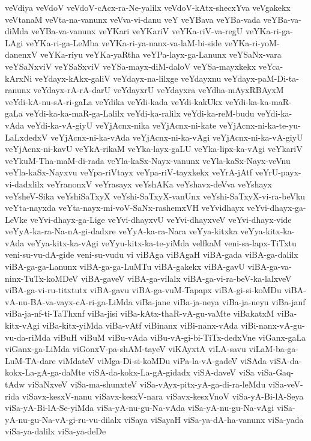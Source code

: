 {veVdiya
veVdoV
veVdoV-cAcx-ra-Ne-yalilx
veVdoV-kAtx-shecxYva
veVgakekx
veVtanaM
veVta-na-vanunx
veVva-vi-danu
veY
veYBava
veYBa-vada
veYBa-va-diMda
veYBa-va-vanunx
veYKari
veYKariV
veYKa-riV-va-regU
veYKa-ri-ga-LAgi
veYKa-ri-ga-LeMba
veYKa-ri-ya-nanx-va-laM-bi-side
veYKa-ri-yoM-danenxV
veYKa-riyu
veYKa-yaRtha
veYPa-layx-ga-Lanunx
veYSaNx-vara
veYSaNxviV
veYSaSxviV
veYSa-mayx-diM-daloV
veYSa-mayxkekx
veYca-kArxNi
veYdayx-kAkx-galiV
veYdayx-na-lilxge
veYdayxnu
veYdayx-paM-Di-ta-ranunx
veYdayx-rA-rA-darU
veYdayxrU
veYdayxra
veYdha-mAyxRBAyxM
veYdi-kA-nu-sA-ri-gaLa
veYdika
veYdi-kada
veYdi-kakUkx
veYdi-ka-ka-maR-gaLa
veYdi-ka-ka-maR-ga-Lalilx
veYdi-ka-ralilx
veYdi-ka-reM-budu
veYdi-ka-vAda
veYdi-ka-vA-giyU
veYjAcnx-nika
veYjAcnx-ni-kate
veYjAcnx-ni-ka-te-yu-LaLxdedxV
veYjAcnx-ni-ka-vAda
veYjAcnx-ni-ka-vAgi
veYjAcnx-ni-ka-vA-giyU
veYjAcnx-ni-kavU
veYkA-rikaM
veYka-layx-gaLU
veYka-lipx-ka-vAgi
veYkariV
veYkuM-Tha-maM-di-rada
veYla-kaSx-Nayx-vanunx
veYla-kaSx-Nayx-veVnu
veYla-kaSx-Nayxvu
veYpa-riVtayx
veYpa-riV-tayxkekx
veYrA-jAtf
veYrU-payx-vi-dadxlilx
veYranonxV
veYrasayx
veYshAKa
veYshavx-deVva
veYshayx
veYsheV-Sika
veYshiSaTxyX
veYshi-SaTxyX-vanUnx
veYshi-SaTxyX-vi-ra-beVku
veYta-nayxda
veYta-nayx-mi-voV-SaNx-rashemxVH
veYvidhayx
veYvi-dhayx-ga-LeVke
veYvi-dhayx-ga-Lige
veYvi-dhayxvU
veYvi-dhayxveV
veYvi-dhayx-vide
veYyA-ka-ra-Na-nA-gi-dadxre
veYyA-ka-ra-Nara
veYya-kitxka
veYya-kitx-ka-vAda
veYya-kitx-ka-vAgi
veYyu-kitx-ka-te-yiMda
velfkaM
veni-sa-lapx-TiTxtu
veni-su-vu-dA-gide
veni-su-vudu
vi
viBAga
viBAgaH
viBA-gada
viBA-ga-dalilx
viBA-ga-ga-Lanunx
viBA-ga-ga-LuMTu
viBA-gakekx
viBA-gavU
viBA-ga-va-ninx-TuTx-koMDeV
viBA-gaveV
viBA-ga-vilalx
viBA-ga-vi-ra-beV-ka-lalxveV
viBA-ga-vi-ru-titxtutx
viBA-gavu
viBA-ga-vuM-Tapapx
viBA-gi-si-koMDu
viBA-vA-nu-BA-va-vayx-cA-ri-ga-LiMda
viBa-jane
viBa-ja-neya
viBa-ja-neyu
viBa-janf
viBa-ja-nf-ti-TaThxnf
viBa-jisi
viBa-kAtx-thaR-vA-gu-vaMte
viBakatxM
viBa-kitx-vAgi
viBa-kitx-yiMda
viBa-vAtf
viBinanx
viBi-nanx-vAda
viBi-nanx-vA-gu-vu-da-riMda
viBuH
viBuM
viBu-vAda
viBu-vA-gi-bi-TiTx-dedxVne
viGanx-gaLa
viGanx-ga-LiMda
viGonxV-pa-shAM-tayeV
viKAyxtA
viLA-savu
viLaM-ba-ga-LuM-TA-dare
viMdateV
viMga-Di-si-koMDu
viPa-la-vA-gadeV
viSAda
viSA-da-kokx-La-gA-ga-daMte
viSA-da-kokx-La-gA-gidadx
viSA-daveV
viSa
viSa-Gaq-tAdw
viSaNxveV
viSa-ma-shunxteV
viSa-vAyx-pitx-yA-ga-di-ra-leMdu
viSa-veV-rida
viSavx-kesxV-nanu
viSavx-kesxV-nara
viSavx-kesxVnoV
viSa-yA-Bi-lA-Seya
viSa-yA-Bi-lA-Se-yiMda
viSa-yA-nu-gu-Na-vAda
viSa-yA-nu-gu-Na-vAgi
viSa-yA-nu-gu-Na-vA-gi-ru-vu-dilalx
viSaya
viSayaH
viSa-ya-dA-ha-vanunx
viSa-yada
viSa-ya-dalilx
viSa-ya-deDe
}
